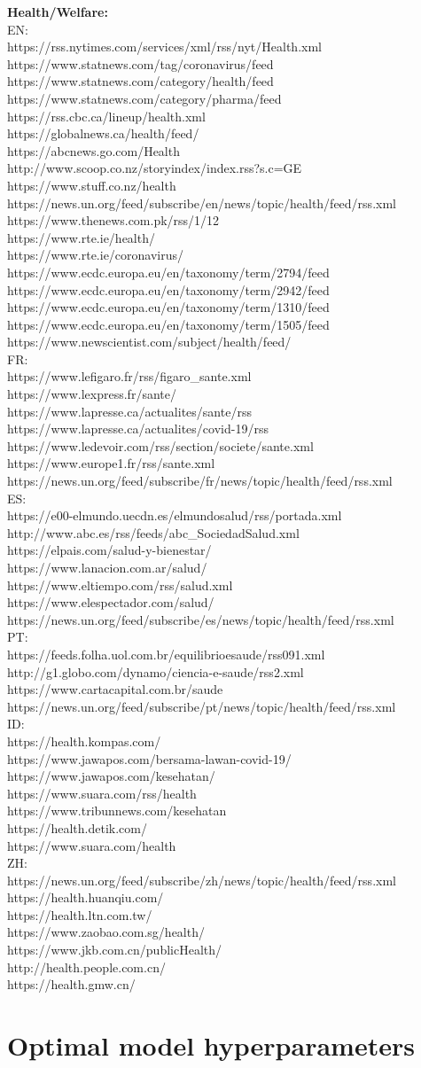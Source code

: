 \documentclass{l4proj}
\begin{document}
\begin{appendices}
\begin{obeylines}
\textbf{Health/Welfare:}
EN:
https://rss.nytimes.com/services/xml/rss/nyt/Health.xml
https://www.statnews.com/tag/coronavirus/feed
https://www.statnews.com/category/health/feed
https://www.statnews.com/category/pharma/feed
https://rss.cbc.ca/lineup/health.xml
https://globalnews.ca/health/feed/
https://abcnews.go.com/Health
http://www.scoop.co.nz/storyindex/index.rss?s.c=GE
https://www.stuff.co.nz/health
https://news.un.org/feed/subscribe/en/news/topic/health/feed/rss.xml
https://www.thenews.com.pk/rss/1/12
https://www.rte.ie/health/
https://www.rte.ie/coronavirus/
https://www.ecdc.europa.eu/en/taxonomy/term/2794/feed
https://www.ecdc.europa.eu/en/taxonomy/term/2942/feed
https://www.ecdc.europa.eu/en/taxonomy/term/1310/feed
https://www.ecdc.europa.eu/en/taxonomy/term/1505/feed
https://www.newscientist.com/subject/health/feed/
FR:
https://www.lefigaro.fr/rss/figaro\_sante.xml
https://www.lexpress.fr/sante/
https://www.lapresse.ca/actualites/sante/rss
https://www.lapresse.ca/actualites/covid-19/rss
https://www.ledevoir.com/rss/section/societe/sante.xml
https://www.europe1.fr/rss/sante.xml
https://news.un.org/feed/subscribe/fr/news/topic/health/feed/rss.xml
ES:
https://e00-elmundo.uecdn.es/elmundosalud/rss/portada.xml
http://www.abc.es/rss/feeds/abc\_SociedadSalud.xml
https://elpais.com/salud-y-bienestar/
https://www.lanacion.com.ar/salud/
https://www.eltiempo.com/rss/salud.xml
https://www.elespectador.com/salud/
https://news.un.org/feed/subscribe/es/news/topic/health/feed/rss.xml
PT:
https://feeds.folha.uol.com.br/equilibrioesaude/rss091.xml
http://g1.globo.com/dynamo/ciencia-e-saude/rss2.xml
https://www.cartacapital.com.br/saude
https://news.un.org/feed/subscribe/pt/news/topic/health/feed/rss.xml
ID:
https://health.kompas.com/
https://www.jawapos.com/bersama-lawan-covid-19/
https://www.jawapos.com/kesehatan/
https://www.suara.com/rss/health
https://www.tribunnews.com/kesehatan
https://health.detik.com/
https://www.suara.com/health
ZH:
https://news.un.org/feed/subscribe/zh/news/topic/health/feed/rss.xml
https://health.huanqiu.com/
https://health.ltn.com.tw/
https://www.zaobao.com.sg/health/
https://www.jkb.com.cn/publicHealth/
http://health.people.com.cn/
https://health.gmw.cn/
\end{obeylines}

\chapter{Optimal model hyperparameters}
\label{appendix:optimal-hparams}


\end{appendices}
\end{document}
